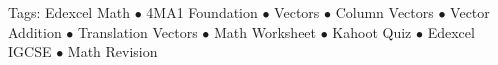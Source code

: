 \documentclass[11pt,a4paper]{article}
\begin{document}
\vspace{14pt}
\begin{center}
  \sffamily\scriptsize\textcolor{textmuted}{
    Tags: Edexcel Math $\bullet$ 4MA1 Foundation $\bullet$ Vectors $\bullet$ Column Vectors $\bullet$ Vector Addition $\bullet$ Translation Vectors $\bullet$ Math Worksheet $\bullet$ Kahoot Quiz $\bullet$ Edexcel IGCSE $\bullet$ Math Revision
  }
\end{center}
\end{document}
